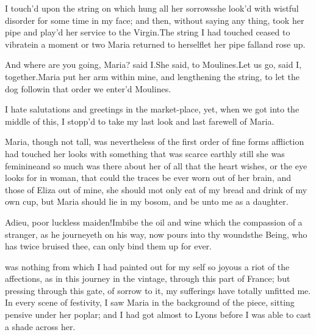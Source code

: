 \documentclass[twoside]{article}
\begin{document}
I touch’d upon the string on which hung
all her sorrows\tskk she look’d with
wistful disorder for some time in my face;
and then, without saying any thing, took
her pipe and play’d her service to the
Virgin.\tskk The string I had touched
ceased to vibrate\tskk in a moment or two
Maria returned to herself\tskk let her
pipe fall\tskk and rose up.

And where are you going, Maria? said
I.\tskk She said, to Moulines.\tskk Let us
go, said I, together.\tskk Maria put her
arm within mine, and lengthening the
string, to let the dog follow\tskk in
that order we enter’d Moulines.





\vskip 6pt


 I hate salutations and
greetings in the market-place, yet, when
we got into the middle of this, I stopp’d
to take my last look and last farewell of
Maria.

Maria, though not tall, was nevertheless
of the first order of fine forms\tskk
affliction had touched her looks with
something that was scarce earthly\tskk
still she was feminine\tskk and so much
was there about her of all that the heart
wishes, or the eye looks for in woman,
that could the traces be ever worn out of
her brain, and those of Eliza out of mine,
she should \i{not only eat of my bread and
drink of my own cup}, but Maria should lie
in my bosom, and be unto me as a daughter.

Adieu, poor luckless maiden!\tskk Imbibe
the oil and wine which the compassion of a
stranger, as he journeyeth on his way, now
pours into thy wounds\tskk the Being, who
has twice bruised thee, can only bind them
up for ever.





\vskip 6pt


 was nothing from which I
had painted out for my self so joyous a
riot of the affections, as in this journey
in the vintage, through this part of
France; but pressing through this gate, of
sorrow to it, my sufferings have totally
unfitted me.  In every scene of festivity,
I saw Maria in the background of the
piece, sitting pensive under her poplar;
and I had got almost to Lyons before I was
able to cast a shade across her.
\end{document}
